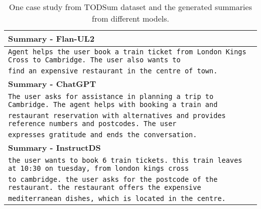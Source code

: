 \documentclass[11pt]{article}
\begin{document}
\begin{table*}[t]
\begin{adjustbox}{width=1.00\textwidth,center}
\begin{tabular}{ | l | }
        \textbf{Summary - Flan-UL2} \\ \hline
        \texttt{Agent helps the user book a train ticket from London Kings Cross to Cambridge. The user also wants to} \\
        \texttt{find an expensive restaurant in the centre of town.}  \\ \hline \hline
        
        \textbf{Summary - ChatGPT} \\ \hline
        \texttt{The user asks for assistance in planning a trip to Cambridge. The agent helps with booking a train and } \\
        \texttt{restaurant reservation with alternatives and provides reference numbers and postcodes. The user } \\
        \texttt{expresses gratitude and ends the conversation.} \\ \hline \hline
        
        \textbf{Summary - InstructDS} \\ \hline
        \texttt{the user wants to book 6 train tickets. this train leaves at 10:30 on tuesday, from london kings cross } \\
        \texttt{to cambridge. the user asks for the postcode of the restaurant. the restaurant offers the expensive} \\
        \texttt{mediterranean dishes, which is located in the centre.} \\
        
        \bottomrule
        \end{tabular}
        \end{adjustbox}
        \caption{One case study from TODSum dataset and the generated summaries from different models.}
        \label{tab:TODSum_examples1}
    \end{table*}
\end{document}
